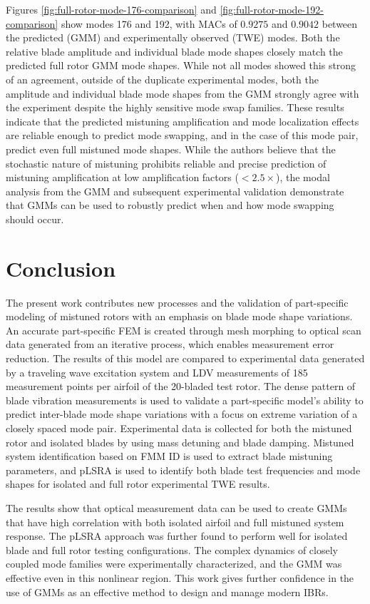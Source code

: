 \documentclass[colorlinks,upint,subscriptcorrection,varvw,hyphenate,balance,govt]{asmeconf}
\begin{document}
Figures \ref{fig:full-rotor-mode-176-comparison} and \ref{fig:full-rotor-mode-192-comparison} show modes 176 and 192, with MACs of $0.9275$ and $0.9042$ between the predicted (GMM) and experimentally observed (TWE) modes. Both the relative blade amplitude and individual blade mode shapes closely match the predicted full rotor GMM mode shapes. While not all modes showed this strong of an agreement, outside of the duplicate experimental modes, both the amplitude and individual blade mode shapes from the GMM strongly agree with the experiment despite the highly sensitive mode swap families. These results indicate that the predicted mistuning amplification and mode localization effects are reliable enough to predict mode swapping, and in the case of this mode pair, predict even full mistuned mode shapes. While the authors believe that the stochastic nature of mistuning prohibits reliable and precise prediction of mistuning amplification at low amplification factors ($< 2.5\times$), the modal analysis from the GMM and subsequent experimental validation demonstrate that GMMs can be used to robustly predict when and how mode swapping should occur.

\section{Conclusion}
The present work contributes new processes and the validation of part-specific modeling of mistuned rotors with an emphasis on blade mode shape variations. An accurate part-specific FEM is created through mesh morphing to optical scan data generated from an iterative process, which enables measurement error reduction. The results of this model are compared to experimental data generated by a traveling wave excitation system and LDV measurements of 185 measurement points per airfoil of the 20-bladed test rotor. The dense pattern of blade vibration measurements is used to validate a part-specific model's ability to predict inter-blade mode shape variations with a focus on extreme variation of a closely spaced mode pair. Experimental data is collected for both the mistuned rotor and isolated blades by using mass detuning and blade damping. Mistuned system identification based on FMM ID is used to extract blade mistuning parameters, and pLSRA is used to identify both blade test frequencies and mode shapes for isolated and full rotor experimental TWE results.

The results show that optical measurement data can be used to create GMMs that have high correlation with both isolated airfoil and full mistuned system response. The pLSRA approach was further found to perform well for isolated blade and full rotor testing configurations. The complex dynamics of closely coupled mode families were experimentally characterized, and the GMM was effective even in this nonlinear region. This work gives further confidence in the use of GMMs as an effective method to design and manage modern IBRs.
\end{document}

